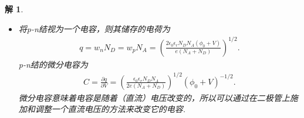 \documentclass[UTF8,10pt,a4paper]{article}
\theoremstyle{Problem}
\theoremstyle{Solution}
\newtheorem*{sol}{解}
\begin{document}
\begin{sol}
\begin{itemize}
        当在p-n结上施加一外加电压$V$，耗尽区两端的电势差由$\phi_0$变为$\phi_0+V$，用相同的方法n型半导体和p型半导体中耗尽区宽度分别为
        \begin{align}
            \nonumber w_n=&\left(\frac{2\epsilon_0\epsilon_rN_A(\phi_0+V)}{eN_D(N_A+N_D)}\right)^{1/2},\\
            \nonumber w_p=&\left(\frac{2\epsilon_0\epsilon_rN_D(\phi_0+V)}{eN_E(N_A+N_D)}\right)^{1/2}.
        \end{align}
        \item[$\triangleright$] 将p-n结视为一个电容，则其储存的电荷为
        \begin{align}
            q=w_nN_D=w_pN_A=\left(\frac{2\epsilon_0\epsilon_rN_DN_A(\phi_0+V)}{e(N_A+N_D)}\right)^{1/2}.
        \end{align}
        p-n结的微分电容为
        \begin{align}
            C=\frac{\partial q}{\partial V}=\left(\frac{\epsilon_0\epsilon_rN_DN_A}{2e(N_A+N_D)}\right)^{1/2}(\phi_0+V)^{-1/2}.
        \end{align}
        微分电容意味着电容是随着（直流）电压改变的，所以可以通过在二极管上施加和调整一个直流电压的方法来改变它的电容.
    \end{itemize}
\end{sol}
\end{document}
